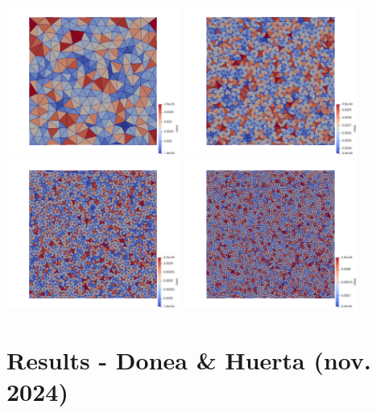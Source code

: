 \begin{center}
\includegraphics[width=5.7cm]{python_codes/fieldstone_120/images/unstructured16}
\includegraphics[width=5.7cm]{python_codes/fieldstone_120/images/unstructured32}\\
\includegraphics[width=5.7cm]{python_codes/fieldstone_120/images/unstructured48}
\includegraphics[width=5.7cm]{python_codes/fieldstone_120/images/unstructured64}
\end{center}


\newpage
\section*{Results - Donea \& Huerta (nov. 2024)}

